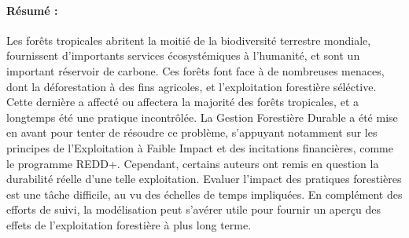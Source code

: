 \documentclass[12pt,]{article}
\theoremstyle{definition}
\theoremstyle{definition}
\theoremstyle{definition}
\theoremstyle{remark}
\begin{document}

\listoftables
\listoffigures

  \newpage
  \scriptsize{
  \paragraph{Résumé :}
  Les forêts tropicales abritent la moitié de la biodiversité terrestre mondiale, fournissent d'importants services écosystémiques à l'humanité, et sont un important réservoir de carbone. Ces forêts font face à de nombreuses menaces, dont la déforestation à des fins agricoles, et l'exploitation forestière séléctive. Cette dernière a affecté ou affectera la majorité des forêts tropicales, et a longtemps été une pratique incontrôlée. La Gestion Forestière Durable a été mise en avant pour tenter de résoudre ce problème, s'appuyant notamment sur les principes de l'Exploitation à Faible Impact et des incitations financières, comme le programme REDD+. Cependant, certains auteurs ont remis en question la durabilité réelle d'une telle exploitation. Evaluer l'impact des pratiques forestières est une tâche difficile, au vu des échelles de temps impliquées. En complément des efforts de suivi, la modélisation peut s'avérer utile pour fournir un aperçu des effets de l'exploitation forestière à plus long terme.   
}
\end{document}
